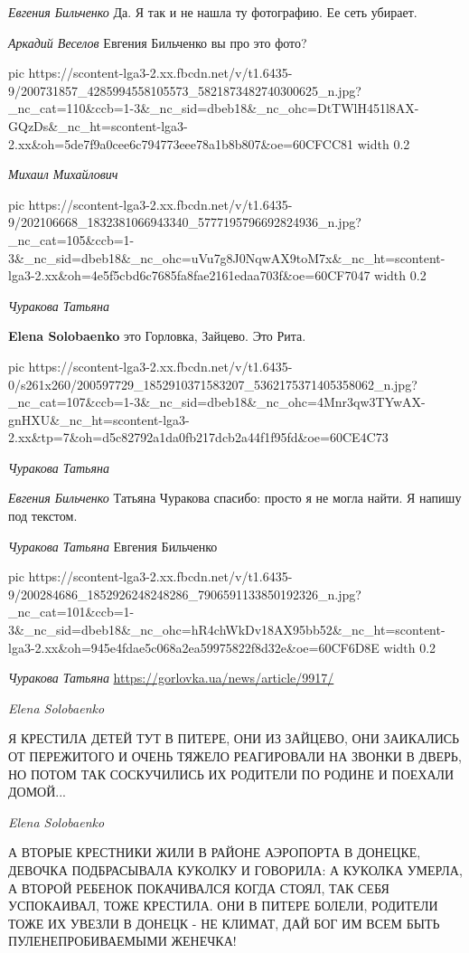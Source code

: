 \emph{Евгения Бильченко}
Да. Я так и не нашла ту фотографию. Ее сеть убирает.

\emph{Аркадий Веселов}
Евгения Бильченко вы про это фото?

\ifcmt
  pic https://scontent-lga3-2.xx.fbcdn.net/v/t1.6435-9/200731857_4285994558105573_5821873482740300625_n.jpg?_nc_cat=110&ccb=1-3&_nc_sid=dbeb18&_nc_ohc=DtTWlH451l8AX-GQzDs&_nc_ht=scontent-lga3-2.xx&oh=5de7f9a0cee6c794773eee78a1b8b807&oe=60CFCC81
  width 0.2
\fi

\emph{Михаил Михайлович}

\ifcmt
  pic https://scontent-lga3-2.xx.fbcdn.net/v/t1.6435-9/202106668_1832381066943340_5777195796692824936_n.jpg?_nc_cat=105&ccb=1-3&_nc_sid=dbeb18&_nc_ohc=uVu7g8J0NqwAX9toM7x&_nc_ht=scontent-lga3-2.xx&oh=4e5f5cbd6c7685fa8fae2161edaa703f&oe=60CF7047
  width 0.2
\fi

\emph{Чуракова Татьяна}

\textbf{Elena Solobaenko} это Горловка, Зайцево. Это Рита.

\ifcmt
  pic https://scontent-lga3-2.xx.fbcdn.net/v/t1.6435-0/s261x260/200597729_1852910371583207_5362175371405358062_n.jpg?_nc_cat=107&ccb=1-3&_nc_sid=dbeb18&_nc_ohc=4Mnr3qw3TYwAX-gnHXU&_nc_ht=scontent-lga3-2.xx&tp=7&oh=d5c82792a1da0fb217dcb2a44f1f95fd&oe=60CE4C73
\fi

\emph{Чуракова Татьяна}

\emph{Евгения Бильченко}
Татьяна Чуракова спасибо: просто я не могла найти. Я напишу под текстом.

\emph{Чуракова Татьяна}
Евгения Бильченко

\ifcmt
  pic https://scontent-lga3-2.xx.fbcdn.net/v/t1.6435-9/200284686_1852926248248286_7906591133850192326_n.jpg?_nc_cat=101&ccb=1-3&_nc_sid=dbeb18&_nc_ohc=hR4chWkDv18AX95bb52&_nc_ht=scontent-lga3-2.xx&oh=945e4fdae5c068a2ea59975822f8d32e&oe=60CF6D8E
	width 0.2
\fi

\emph{Чуракова Татьяна}
\url{https://gorlovka.ua/news/article/9917/}

\emph{Elena Solobaenko}

Я КРЕСТИЛА ДЕТЕЙ ТУТ В ПИТЕРЕ, ОНИ ИЗ ЗАЙЦЕВО, ОНИ ЗАИКАЛИСЬ ОТ ПЕРЕЖИТОГО И
ОЧЕНЬ ТЯЖЕЛО РЕАГИРОВАЛИ НА ЗВОНКИ В ДВЕРЬ, НО ПОТОМ ТАК СОСКУЧИЛИСЬ ИХ
РОДИТЕЛИ ПО РОДИНЕ И ПОЕХАЛИ ДОМОЙ...

\emph{Elena Solobaenko}

А ВТОРЫЕ КРЕСТНИКИ ЖИЛИ В РАЙОНЕ АЭРОПОРТА В ДОНЕЦКЕ, ДЕВОЧКА ПОДБРАСЫВАЛА
КУКОЛКУ И ГОВОРИЛА: А КУКОЛКА УМЕРЛА, А ВТОРОЙ РЕБЕНОК ПОКАЧИВАЛСЯ КОГДА СТОЯЛ,
ТАК СЕБЯ УСПОКАИВАЛ, ТОЖЕ КРЕСТИЛА. ОНИ В ПИТЕРЕ БОЛЕЛИ, РОДИТЕЛИ ТОЖЕ ИХ
УВЕЗЛИ В ДОНЕЦК - НЕ КЛИМАТ, ДАЙ БОГ ИМ ВСЕМ БЫТЬ ПУЛЕНЕПРОБИВАЕМЫМИ ЖЕНЕЧКА!

